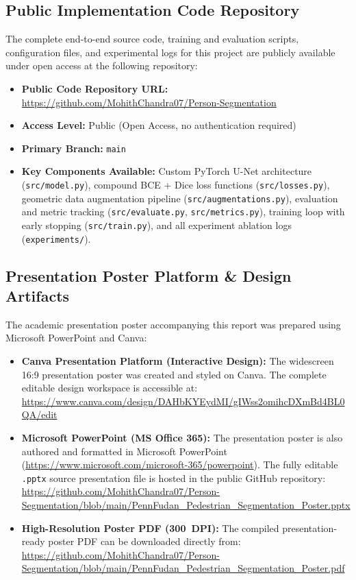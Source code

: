 \documentclass[10pt,a4paper]{report}
\begin{document}
\subsection*{Public Implementation Code Repository}
The complete end-to-end source code, training and evaluation scripts, configuration files, and experimental logs for this project are publicly available under open access at the following repository:
\begin{itemize}\setlength{\itemsep}{1pt}\setlength{\parskip}{0pt}\setlength{\parsep}{0pt}
    \item \textbf{Public Code Repository URL:} \url{https://github.com/MohithChandra07/Person-Segmentation}
    \item \textbf{Access Level:} Public (Open Access, no authentication required)
    \item \textbf{Primary Branch:} \texttt{main}
    \item \textbf{Key Components Available:} Custom PyTorch U-Net architecture (\texttt{src/model.py}), compound BCE + Dice loss functions (\texttt{src/losses.py}), geometric data augmentation pipeline (\texttt{src/augmentations.py}), evaluation and metric tracking (\texttt{src/evaluate.py}, \texttt{src/metrics.py}), training loop with early stopping (\texttt{src/train.py}), and all experiment ablation logs (\texttt{experiments/}).
\end{itemize}

\subsection*{Presentation Poster Platform \& Design Artifacts}
The academic presentation poster accompanying this report was prepared using Microsoft PowerPoint and Canva:
\begin{itemize}\setlength{\itemsep}{1pt}\setlength{\parskip}{0pt}\setlength{\parsep}{0pt}
    \item \textbf{Canva Presentation Platform (Interactive Design):} The widescreen 16:9 presentation poster was created and styled on Canva. The complete editable design workspace is accessible at: \\
    \url{https://www.canva.com/design/DAHbKYEydMI/gIWss2omihcDXmBd4BL0QA/edit}
    \item \textbf{Microsoft PowerPoint (MS Office 365):} The presentation poster is also authored and formatted in Microsoft PowerPoint (\url{https://www.microsoft.com/microsoft-365/powerpoint}). The fully editable \texttt{.pptx} source presentation file is hosted in the public GitHub repository: \\
    \url{https://github.com/MohithChandra07/Person-Segmentation/blob/main/PennFudan_Pedestrian_Segmentation_Poster.pptx}
    \item \textbf{High-Resolution Poster PDF (300~DPI):} The compiled presentation-ready poster PDF can be downloaded directly from: \\
    \url{https://github.com/MohithChandra07/Person-Segmentation/blob/main/PennFudan_Pedestrian_Segmentation_Poster.pdf}
\end{itemize}
\end{document}
